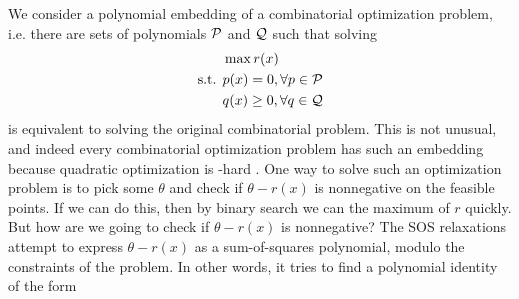 We consider a polynomial embedding of a combinatorial optimization problem, i.e. there are sets of polynomials $\mathcal P$ and $\mathcal Q$ such that solving
\begin{align*}
&\max r(x) \\
\text{s.t. } &p(x) = 0, \forall p \in \mathcal P \\
&q(x) \geq 0, \forall q \in \mathcal Q
\end{align*}
is equivalent to solving the original combinatorial problem. This is not unusual, and indeed every combinatorial optimization problem has such an embedding because quadratic optimization is \np-hard \cite{}. One way to solve such an optimization problem is to pick some $\theta$ and check if $\theta - r(x)$ is nonnegative on the feasible points. If we can do this, then by binary search we can the maximum of $r$ quickly. But how are we going to check if $\theta - r(x)$ is nonnegative? The SOS relaxations attempt to express $\theta - r(x)$ as a sum-of-squares polynomial, modulo the constraints of the problem. In other words, it tries to find a polynomial identity of the form
